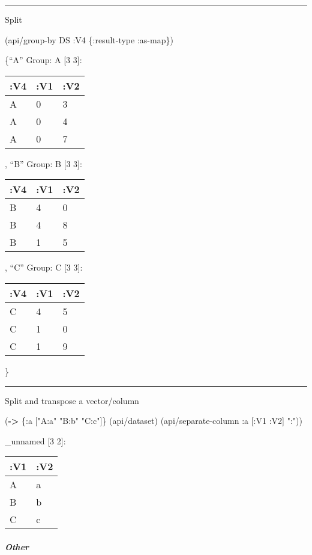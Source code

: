 \documentclass[]{article}
\newenvironment{Shaded}{\begin{snugshade}}{\end{snugshade}}
\newcommand{\KeywordTok}[1]{\textcolor[rgb]{0.13,0.29,0.53}{\textbf{#1}}}
\newcommand{\StringTok}[1]{\textcolor[rgb]{0.31,0.60,0.02}{#1}}
\newcommand{\AttributeTok}[1]{\textcolor[rgb]{0.77,0.63,0.00}{#1}}
\newcommand{\NormalTok}[1]{#1}
\let\oldsubparagraph\subparagraph
\renewcommand{\subparagraph}[1]{\oldsubparagraph{#1}\mbox{}}
\begin{document}
\begin{center}\rule{0.5\linewidth}{0.5pt}\end{center}

Split

\begin{Shaded}
\begin{Highlighting}[]
\NormalTok{(api/group-by DS }\AttributeTok{:V4}\NormalTok{ \{}\AttributeTok{:result-type} \AttributeTok{:as-map}\NormalTok{\})}
\end{Highlighting}
\end{Shaded}

\{``A'' Group: A {[}3 3{]}:

\begin{longtable}[]{@{}lll@{}}
\toprule
:V4 & :V1 & :V2\tabularnewline
\midrule
\endhead
A & 0 & 3\tabularnewline
A & 0 & 4\tabularnewline
A & 0 & 7\tabularnewline
\bottomrule
\end{longtable}

, ``B'' Group: B {[}3 3{]}:

\begin{longtable}[]{@{}lll@{}}
\toprule
:V4 & :V1 & :V2\tabularnewline
\midrule
\endhead
B & 4 & 0\tabularnewline
B & 4 & 8\tabularnewline
B & 1 & 5\tabularnewline
\bottomrule
\end{longtable}

, ``C'' Group: C {[}3 3{]}:

\begin{longtable}[]{@{}lll@{}}
\toprule
:V4 & :V1 & :V2\tabularnewline
\midrule
\endhead
C & 4 & 5\tabularnewline
C & 1 & 0\tabularnewline
C & 1 & 9\tabularnewline
\bottomrule
\end{longtable}

\}

\begin{center}\rule{0.5\linewidth}{0.5pt}\end{center}

Split and transpose a vector/column

\begin{Shaded}
\begin{Highlighting}[]
\NormalTok{(}\KeywordTok{->}\NormalTok{ \{}\AttributeTok{:a}\NormalTok{ [}\StringTok{"A:a"} \StringTok{"B:b"} \StringTok{"C:c"}\NormalTok{]\}}
\NormalTok{    (api/dataset)}
\NormalTok{    (api/separate-column }\AttributeTok{:a}\NormalTok{ [}\AttributeTok{:V1} \AttributeTok{:V2}\NormalTok{] }\StringTok{":"}\NormalTok{))}
\end{Highlighting}
\end{Shaded}

\_unnamed {[}3 2{]}:

\begin{longtable}[]{@{}ll@{}}
\toprule
:V1 & :V2\tabularnewline
\midrule
\endhead
A & a\tabularnewline
B & b\tabularnewline
C & c\tabularnewline
\bottomrule
\end{longtable}

\subparagraph{Other}\label{other-1}
\end{document}
